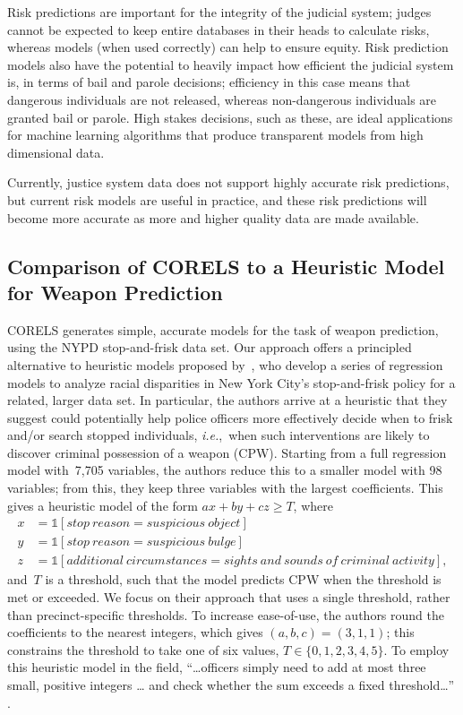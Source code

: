 \documentclass[twoside,11pt]{article}
\def\ie{{\it i.e.},~}
\def\one{\mathds{1}}
\def\one{\mathds{1}}
\newcommand{\nn}{\nonumber}
\begin{document}
Risk predictions are important for the integrity of the judicial system; judges cannot be expected to keep entire databases in their heads to calculate risks, whereas models (when used correctly) can help to ensure equity.
%
Risk prediction models also have the potential to heavily impact how efficient the judicial system is, in terms of bail and parole decisions; efficiency in this case means that dangerous individuals are not released, whereas non-dangerous individuals are granted bail or parole.
%
High stakes decisions, such as these, are ideal applications for machine learning algorithms that produce transparent models from high dimensional data.

Currently, justice system data does not support highly accurate risk predictions, but current risk models are useful in practice, and these risk predictions will become more accurate as more and higher quality data are made available.

\subsection{Comparison of CORELS to a Heuristic Model for Weapon Prediction}
\label{sec:frisk}

CORELS generates simple, accurate models for the task of weapon prediction,
using the NYPD stop-and-frisk data set.
%
Our approach offers a principled alternative to heuristic models proposed by~\citet{Goel16},
who develop a series of regression models to analyze racial disparities
in New York City's stop-and-frisk policy for a related, larger data set.
%
In particular, the authors arrive at a heuristic that they suggest
could potentially help police officers more effectively decide when to
frisk and/or search stopped individuals, \ie when such
interventions are likely to discover criminal possession of a weapon (CPW).
%
Starting from a full regression model with~7,705 variables, the authors reduce this to a
smaller model with 98 variables; from this, they keep three variables with the largest coefficients.
%
This gives a heuristic model of the form ${ax + by + cz \ge T}$,
where
\begin{align}
x &= \one[stop~reason = suspicious~object] \nn \\
y &= \one[stop~reason = suspicious~bulge] \nn \\
z &= \one[additional~circumstances = sights~and~sounds~of~criminal~activity], \nn
\end{align}
and~$T$ is a threshold, such that the model predicts CPW when the threshold is met or exceeded.
%
We focus on their approach that uses a single threshold, rather than precinct-specific thresholds.
%
To increase ease-of-use, the authors round the coefficients
to the nearest integers, which gives ${(a, b, c) = (3, 1, 1)}$;
this constrains the threshold to take one of six values, ${T \in \{0, 1, 2, 3, 4, 5\}}$.
%
To employ this heuristic model in the field,
``\dots officers simply need to add at most three small, positive integers \dots
and check whether the sum exceeds a fixed threshold\dots'' \citep{Goel16}.
\end{document}
